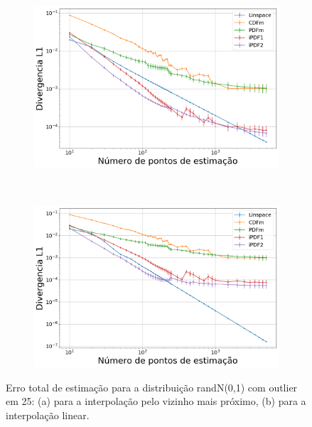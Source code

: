 \begin{figure}[H]
	\centering
	\begin{subfigure}[b]{0.45\textwidth}
		\centering 
		\includegraphics[width=\textwidth]{./figuras/ERRORPLOT_L1_FALSE_NORMAL_NEAREST_100025}
		\caption{}
		\label{fig:error_norm_near_50}
	\end{subfigure}
	\hfill
	~ %
	\begin{subfigure}[b]{0.45\textwidth}
		\centering 
		\includegraphics[width=\textwidth]{./figuras/ERRORPLOT_L1_FALSE_NORMAL_LINEAR_100025}
		\caption{}
		\label{fig:error_norm_lin_50}
	\end{subfigure}
	\caption{Erro total de estimação para a distribuição randN(0,1) com outlier em 25: (a) para a interpolação pelo vizinho mais próximo, (b) para a interpolação linear.}
	\label{fig:Error_out}
\end{figure}

